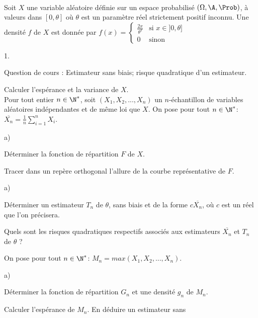 \documentclass[11pt]{article}%
\begin{document}
\begin{exerciceAP}~\\
  Soit $X$ une variable aléatoire définie sur un espace probabilisé
  $(\Omega, \A, \Prob)$, à valeurs dans $[0, \theta]$ où
  $\theta$ est un paramètre réel strictement positif inconnu. Une
  densité $f$ de $X$ est donnée par $f(x)= \left\{\begin{array}{lr}
      \frac{2x}{\theta^2} & \text{si } x \in ]0, \theta] \\ 0 &
      \text{sinon}
    \end{array} \right.$
  \begin{noliste}{1.}
    \setlength{\itemsep}{2mm}
  \item Question de cours : Estimateur sans biais; risque quadratique
    d'un estimateur.
  \item Calculer l'espérance et la variance de $X$.\\ 
    Pour tout entier $n \in \N^*$, soit $(X_1,X_2,...,X_n)$ un
    $n$-échantillon de variables aléatoires indépendantes et de même
    loi que $X$. On pose pour tout $n \in \N^*$: $\overline{X_n}=
    \frac{1}{n} \sum \limits_{i=1}^n X_i$. \\ 
  \item \begin{noliste}{a)}
    \setlength{\itemsep}{2mm}
    \item Déterminer la fonction de répartition $F$ de $X$.
    \item Tracer dans un repère orthogonal l'allure de la courbe
      représentative de $F$.
    \end{noliste}
  \item \begin{noliste}{a)}
    \setlength{\itemsep}{2mm}
    \item Déterminer un estimateur $T_n$ de $\theta$, sans biais et de
      la forme $c \overline{X_n}$, où $c$ est un réel que l'on
      précisera.
    \item Quels sont les risques quadratiques respectifs associés aux
      estimateurs $\overline{X_n}$ et $T_n$ de $\theta$ ?
    \end{noliste}
  \item On pose pour tout $n \in \N^*$: $M_n=max(X_1, X_2, ..., X_n)$.
    \begin{noliste}{a)}
    \setlength{\itemsep}{2mm}
    \item Déterminer la fonction de répartition $G_n$ et une densité
      $g_n$ de $M_n$.
    \item Calculer l'espérance de $M_n$. En déduire un estimateur sans

\end{noliste}
\end{noliste}
\end{exerciceAP}
\end{document}
